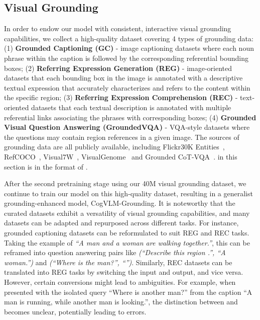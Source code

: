\subsection{Visual Grounding}








In order to endow our model with consistent, interactive visual grounding capabilities, we collect a high-quality dataset covering 4 types of grounding data: (1) \textbf{Grounded Captioning (GC)} - image captioning datasets where each noun phrase within the caption is followed by the corresponding referential bounding boxes; (2) \textbf{Referring Expression Generation (REG)} - image-oriented datasets that each bounding box in the image is annotated with a descriptive textual expression that accurately characterizes and refers to the content within the specific region; (3) \textbf{Referring Expression Comprehension (REC)} - text-oriented datasets that each textual description is annotated with multiple referential links associating the phrases with corresponding boxes; (4) \textbf{Grounded Visual Question Answering (GroundedVQA)} - VQA-style datasets where the questions may contain region references in a given image.
The sources of grounding data are all publicly available, including Flickr30K Entities~\citep{plummer2015flickr30k}, RefCOCO~\citep{kazemzadeh2014referitgame,mao2016generation,yu2016modeling}, Visual7W~\citep{zhu2016visual7w}, VisualGenome~\citep{krishna2017visual} and Grounded CoT-VQA~\citep{chen2023shikra}.
 in this section is in the format of . 



After the second pretraining stage using our 40M visual grounding dataset, we continue to train our model on this high-quality dataset, resulting in a generalist grounding-enhanced model, CogVLM-Grounding.
It is noteworthy that the curated datasets exhibit a versatility of visual grounding capabilities, and many datasets can be adapted and repurposed across different tasks.
For instance, grounded captioning datasets can be reformulated to suit REG and REC tasks. Taking the example of \textit{``A man  and a woman  are walking together.''}, this can be reframed into question answering pairs like \textit{(``Describe this region .'', ``A woman.'')} and \textit{(``Where is the man?'', ``'')}. Similarly, REC datasets can be translated into REG tasks by switching the input and output, and vice versa. However, certain conversions might lead to ambiguities. For example, when presented with the isolated query ``Where is another man?'' from the caption ``A man  is running, while another man  is looking.'', the distinction between  and  becomes unclear, potentially leading to errors.

